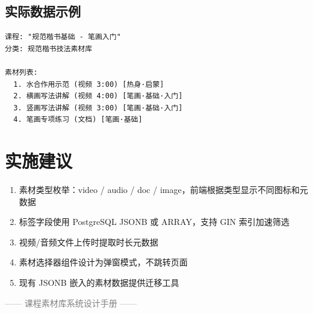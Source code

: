 \documentclass[11pt,a4paper]{article}
\begin{document}
\subsection{实际数据示例}

\begin{verbatim}
课程: "规范楷书基础 - 笔画入门"
分类: 规范楷书技法素材库

素材列表:
  1. 水合作用示范 (视频 3:00) [热身·启蒙]
  2. 横画写法讲解 (视频 4:00) [笔画·基础·入门]
  3. 竖画写法讲解 (视频 3:00) [笔画·基础·入门]
  4. 笔画专项练习 (文档) [笔画·基础]
\end{verbatim}

\section{实施建议}

\begin{enumerate}
  \item 素材类型枚举：video / audio / doc / image，前端根据类型显示不同图标和元数据
  \item 标签字段使用 PostgreSQL JSONB 或 ARRAY，支持 GIN 索引加速筛选
  \item 视频/音频文件上传时提取时长元数据
  \item 素材选择器组件设计为弹窗模式，不跳转页面
  \item 现有 JSONB 嵌入的素材数据提供迁移工具
\end{enumerate}

\vfill
\begin{center}
\small \textcolor{gray}{—— 课程素材库系统设计手册 ——}
\end{center}
\end{document}
